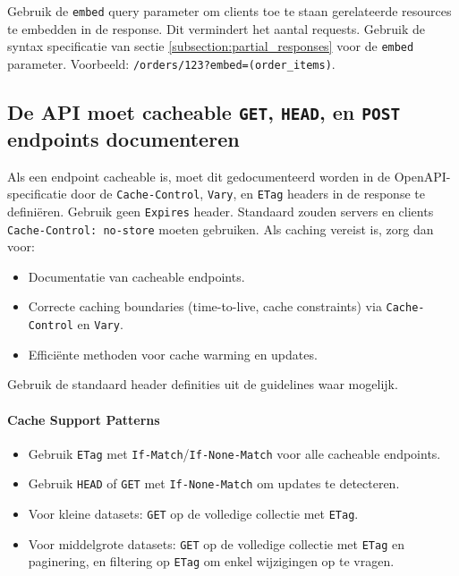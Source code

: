Gebruik de \texttt{embed} query parameter om clients toe te staan gerelateerde resources te embedden in de response. Dit vermindert het aantal requests. Gebruik de syntax specificatie van sectie \ref{subsection:partial_responses} voor de \texttt{embed} parameter. Voorbeeld: \texttt{/orders/123?embed=(order\_items)}.

\subsection{De API moet cacheable \texttt{GET}, \texttt{HEAD}, en \texttt{POST} endpoints documenteren}
\label{subsection:caching}

Als een endpoint cacheable is, moet dit gedocumenteerd worden in de OpenAPI-specificatie door de \texttt{Cache-Control}, \texttt{Vary}, en \texttt{ETag} headers in de response te definiëren. Gebruik geen \texttt{Expires} header. Standaard zouden servers en clients \texttt{Cache-Control: no-store} moeten gebruiken. Als caching vereist is, zorg dan voor:

\begin{itemize}
    \item Documentatie van cacheable endpoints.
    \item Correcte caching boundaries (time-to-live, cache constraints) via \texttt{Cache-Control} en \texttt{Vary}.
    \item Efficiënte methoden voor cache warming en updates.
\end{itemize}

Gebruik de standaard header definities uit de guidelines waar mogelijk.

\paragraph{Cache Support Patterns}

\begin{itemize}
    \item Gebruik \texttt{ETag} met \texttt{If-Match}/\texttt{If-None-Match} voor alle cacheable endpoints.
    \item Gebruik \texttt{HEAD} of \texttt{GET} met \texttt{If-None-Match} om updates te detecteren.
    \item Voor kleine datasets: \texttt{GET} op de volledige collectie met \texttt{ETag}.
    \item Voor middelgrote datasets: \texttt{GET} op de volledige collectie met \texttt{ETag} en paginering, en filtering op \texttt{ETag} om enkel wijzigingen op te vragen.
\end{itemize}


